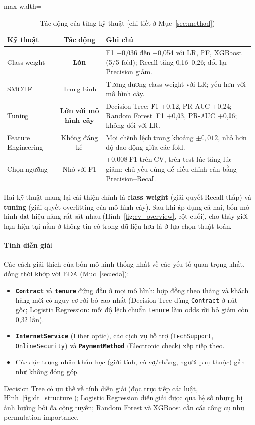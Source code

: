 \begin{table}[H]
\centering
\small
\begin{adjustbox}{max width=\textwidth}
\begin{tabular}{|l|c|p{9cm}|}
\hline
\textbf{Kỹ thuật} & \textbf{Tác động} & \textbf{Ghi chú} \\
\hline
Class weight & \textbf{Lớn} & F1 +0,036 đến +0,054 với LR, RF, XGBoost (5/5 fold); Recall tăng 0,16--0,26; đổi lại Precision giảm. \\
\hline
SMOTE & Trung bình & Tương đương class weight với LR; yếu hơn với mô hình cây. \\
\hline
Tuning & \textbf{Lớn với mô hình cây} & Decision Tree: F1 +0,12, PR-AUC +0,24; Random Forest: F1 +0,03, PR-AUC +0,06; không đổi với LR. \\
\hline
Feature Engineering & Không đáng kể & Mọi chênh lệch trong khoảng $\pm 0{,}012$, nhỏ hơn độ dao động giữa các fold. \\
\hline
Chọn ngưỡng & Nhỏ với F1 & +0,008 F1 trên CV, trên test lúc tăng lúc giảm; chủ yếu dùng để điều chỉnh cân bằng Precision--Recall. \\
\hline
\end{tabular}
\end{adjustbox}
\caption{Tác động của từng kỹ thuật (chi tiết ở Mục~\ref{sec:method})}
\label{tab:summary_effects}
\end{table}

Hai kỹ thuật mang lại cải thiện chính là \textbf{class weight} (giải quyết Recall thấp) và \textbf{tuning} (giải quyết overfitting của mô hình cây). Sau khi áp dụng cả hai, bốn mô hình đạt hiệu năng rất sát nhau (Hình~\ref{fig:cv_overview}, cột cuối), cho thấy giới hạn hiện tại nằm ở thông tin có trong dữ liệu hơn là ở lựa chọn thuật toán.

\paragraph{Tính diễn giải}
Các cách giải thích của bốn mô hình thống nhất về các yếu tố quan trọng nhất, đồng thời khớp với EDA (Mục~\ref{sec:eda}):
\begin{itemize}
    \item \textbf{\texttt{Contract}} và \textbf{\texttt{tenure}} đứng đầu ở mọi mô hình: hợp đồng theo tháng và khách hàng mới có nguy cơ rời bỏ cao nhất (Decision Tree dùng \texttt{Contract} ở nút gốc; Logistic Regression: mỗi độ lệch chuẩn \texttt{tenure} làm odds rời bỏ giảm còn 0,32 lần).
    \item \textbf{\texttt{InternetService}} (Fiber optic), các dịch vụ hỗ trợ (\texttt{TechSupport}, \texttt{OnlineSecurity}) và \textbf{\texttt{PaymentMethod}} (Electronic check) xếp tiếp theo.
    \item Các đặc trưng nhân khẩu học (giới tính, có vợ/chồng, người phụ thuộc) gần như không đóng góp.
\end{itemize}
Decision Tree có ưu thế về tính diễn giải (đọc trực tiếp các luật, Hình~\ref{fig:dt_structure}); Logistic Regression diễn giải được qua hệ số nhưng bị ảnh hưởng bởi đa cộng tuyến; Random Forest và XGBoost cần các công cụ như permutation importance.

